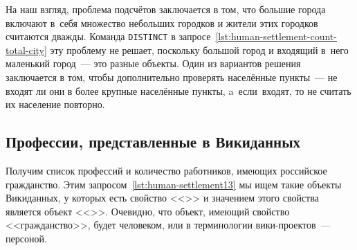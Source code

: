 На наш взгляд, проблема подсчётов заключается в том, 
что большие города включают в~себя множество небольших городков и жители этих городков считаются дважды. 
Команда \lstinline|DISTINCT|%
%
%
%
%
в запросе~\ref{lst:human-settlement-count-total-city} 
эту проблему не решает, поскольку большой город и входящий в~него маленький город~--- это разные объекты. 
Один из вариантов решения заключается в том, 
чтобы дополнительно проверять населённые пункты~---  
не входят ли они в более крупные населённые пункты, 
a~если~входят, то не считать их население повторно. 



\subsection{Профессии, представленные в Викиданных}

Получим список профессий и количество работников, 
имеющих российское гражданство. 
Этим запросом~\ref{lst:human-settlement13} 
мы ищем такие объекты Викиданных, 
у которых есть свойство <<>> 
и значением этого свойства является объект <<>>. 
Очевидно, что объект, имеющий свойство <<гражданство>>, будет человеком, 
или в терминологии вики-проектов~--- персоной. 


